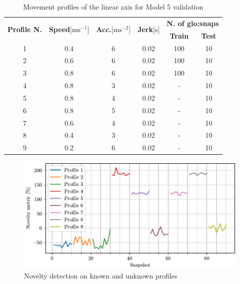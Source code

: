 \begin{table}
    \centering
    \caption{Movement profiles of the linear axis for Model 5 validation}
    \label{tab:etel_profiles_2}
    \begin{tabular}{cccccc} 
    \toprule
    \multirow{2}{*}{\textbf{Profile N.}} & \multirow{2}{*}{\textbf{Speed}{[}$\text{m}\text{s}^{-1}$]} & \multirow{2}{*}{\textbf{ Acc.}{[}$\text{m}\text{s}^{-2}$]} & \multirow{2}{*}{\textbf{Jerk}{[}$\text{s}$]} & \multicolumn{2}{c}{\textbf{N. of \gls{glo:snap}s}} \\
     &  &  &  & \textbf{Train} & \textbf{Test} \\ 
    \hline
    1 & 0.4 & 6 & 0.02 & 100 & 10 \\
    2 & 0.6 & 6 & 0.02 & 100 & 10 \\
    3 & 0.8 & 6 & 0.02 & 100 & 10 \\
    4 & 0.8 & 3 & 0.02 & - & 10 \\
    5 & 0.8 & 4 & 0.02 & - & 10 \\
    6 & 0.8 & 5 & 0.02 & - & 10 \\
    7 & 0.6 & 4 & 0.02 & - & 10 \\
    8 & 0.4 & 3 & 0.02 & - & 10 \\
    9 & 0.2 & 6 & 0.02 & - & 10 \\
    \bottomrule
    \end{tabular}
    \end{table}

\begin{figure}
    \centering
    \includegraphics[width=\textwidth]{images/LinearMotor/Testing3.pdf}
    \caption{Novelty detection on known and unknown profiles}
    \label{fig:axis_testing3}
\end{figure}